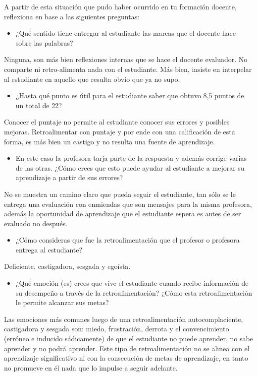 \documentclass[12pt,letterpaper,article,x11names]{memoir}
\begin{document}
A partir de esta situación que pudo haber ocurrido en tu formación docente, reflexiona en base a las siguientes preguntas:
\begin{itemize}
\item ¿Qué sentido tiene entregar al estudiante las marcas que el docente hace sobre las palabras?
\end{itemize}
Ninguna, son más bien reflexiones internas que se hace el docente evaluador. No comparte ni retro-alimenta nada con el estudiante. Más bien, insiste en interpelar al estudiante en aquello que resulta obvio que ya no supo. 
\begin{itemize}
\item ¿Hasta qué punto es útil para el estudiante saber que obtuvo 8,5 puntos de un total de 22?
\end{itemize}
Conocer el puntaje no permite al estudiante conocer sus errores y posibles mejoras. Retroalimentar con puntaje y por ende con una calificación de esta forma, es más bien un castigo y no resulta una fuente de aprendizaje.
\begin{itemize}
\item En este caso la profesora tarja parte de la respuesta y además corrige varias de las otras. ¿Cómo crees que esto puede ayudar al estudiante a mejorar su aprendizaje a partir de sus errores?
\end{itemize}
No se muestra un camino claro que pueda seguir el estudiante, tan sólo se le entrega una evaluación con enmiendas que son mensajes para la misma profesora, además la oportunidad de aprendizaje que el estudiante espera es antes de ser evaluado no después.
\begin{itemize}
\item ¿Cómo consideras que fue la retroalimentación que el profesor o profesora entrega al estudiante?
\end{itemize}
Deficiente, castigadora, sesgada y egoísta.
\begin{itemize}
\item ¿Qué emoción (es) crees que vive el estudiante cuando recibe información de su desempeño a través de la retroalimentación? ¿Cómo esta retroalimentación le permite alcanzar sus metas?
\end{itemize}
Las emociones más comunes luego de una retroalimentación autocomplaciente, castigadora y sesgada son: miedo, frustración, derrota y el convencimiento (erróneo e inducido sádicamente) de que el estudiante no puede aprender, no sabe aprender y no podrá aprender. Este tipo de retroalimentación no se alinea con el aprendizaje significativo ni con la consecución de metas de aprendizaje, en tanto no promueve en él nada que lo impulse a seguir adelante. 
\end{document}
